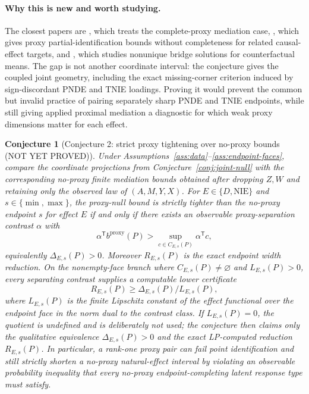 \documentclass[11pt]{article}
\newcommand{\transpose}{\mathsf{T}}
\theoremstyle{definition}
\theoremstyle{plain}
\newtheorem{conjecture}{Conjecture}
\theoremstyle{remark}
\begin{document}
\paragraph{Why this is new and worth studying.}
The closest papers are \citet{DukesShpitserTchetgen2023}, which treats the complete-proxy mediation case, \citet{GhassamiShpitserTchetgen2023}, which gives proxy partial-identification bounds without completeness for related causal-effect targets, and \citet{ZhangLiMiaoTchetgen2023}, which studies nonunique bridge solutions for counterfactual means.  The gap is not another coordinate interval: the conjecture gives the coupled joint geometry, including the exact missing-corner criterion induced by sign-discordant PNDE and TNIE loadings.  Proving it would prevent the common but invalid practice of pairing separately sharp PNDE and TNIE endpoints, while still giving applied proximal mediation a diagnostic for which weak proxy dimensions matter for each effect.

\begin{conjecture}[Conjecture 2: strict proxy tightening over no-proxy bounds (NOT YET PROVED)]\label{conj:tightening}
Under Assumptions~\ref{ass:data}--\ref{ass:endpoint-faces}, compare the coordinate projections from Conjecture~\ref{conj:joint-null} with the corresponding no-proxy finite mediation bounds obtained after dropping \(Z,W\) and retaining only the observed law of \((A,M,Y,X)\).  For \(E\in\{D,\mathrm{NIE}\}\) and \(s\in\{\min,\max\}\), the proxy-null bound is strictly tighter than the no-proxy endpoint \(s\) for effect \(E\) if and only if there exists an observable proxy-separation contrast \(\alpha\) with
\[
\alpha^\transpose b^{\mathrm{proxy}}(P)>
\sup_{c\in C_{E,s}(P)}\alpha^\transpose c,
\]
equivalently \(\Delta_{E,s}(P)>0\).  Moreover \(R_{E,s}(P)\) is the exact endpoint width reduction.  On the nonempty-face branch where \(C_{E,s}(P)\neq\varnothing\) and \(L_{E,s}(P)>0\), every separating contrast supplies a computable lower certificate
\[
R_{E,s}(P)\ge
\Delta_{E,s}(P)/L_{E,s}(P),
\]
where \(L_{E,s}(P)\) is the finite Lipschitz constant of the effect functional over the endpoint face in the norm dual to the contrast class.  If \(L_{E,s}(P)=0\), the quotient is undefined and is deliberately not used; the conjecture then claims only the qualitative equivalence \(\Delta_{E,s}(P)>0\) and the exact LP-computed reduction \(R_{E,s}(P)\).  In particular, a rank-one proxy pair can fail point identification and still strictly shorten a no-proxy natural-effect interval by violating an observable probability inequality that every no-proxy endpoint-completing latent response type must satisfy.
\end{conjecture}
\end{document}
